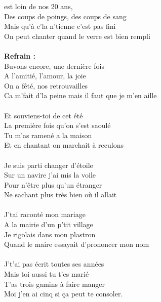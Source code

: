 
 est loin de nos 20 ans,
\\Des coups de poings, des coups de sang
\\Mais qu'à c'la n'tienne c'est pas fini
\\On peut chanter quand le verre est bien rempli
\\\\\textbf{Refrain :}
\\Buvons encore, une dernière fois
\\A l'amitié, l'amour, la joie
\\On a fêté, nos retrouvailles
\\Ca m'fait d'la peine mais il faut que je m'en aille
\\\\Et souviens-toi de cet été
\\La première fois qu'on s'est saoulé
\\Tu m'as ramené a la maison
\\Et en chantant on marchait à reculons
\\\\Je suis parti changer d'étoile
\\Sur un navire j'ai mis la voile
\\Pour n'être plus qu'un étranger
\\Ne sachant plus très bien où il allait
\\\\J'tai raconté mon mariage
\\A la mairie d'un p'tit village
\\Je rigolais dans mon plastron
\\Quand le maire essayait d'prononcer mon nom
\\\\J't'ai pas écrit toutes ses années
\\Mais toi aussi tu t'es marié
\\T'as trois gamins à faire manger
\\Moi j'en ai cinq si ça peut te consoler.

\breakpage